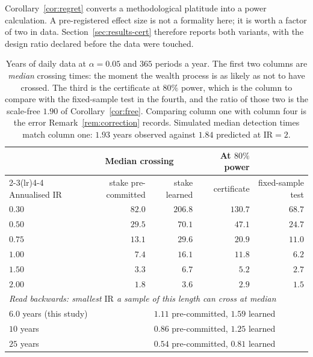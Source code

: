 \documentclass{article}
\theoremstyle{plain}
\theoremstyle{definition}
\begin{document}
Corollary~\ref{cor:regret} converts a methodological platitude into a power calculation. A
pre-registered effect size is not a formality here; it is worth a factor of two in data.
Section~\ref{sec:results-cert} therefore reports both variants, with the design ratio
declared before the data were touched.

\begin{table}[t]
  \centering
  \caption{Years of daily data at $\alpha=0.05$ and $365$ periods a year. The first two
  columns are \emph{median} crossing times: the moment the wealth process is as likely as not
  to have crossed. The third is the certificate at $80\%$ power, which is the column to
  compare with the fixed-sample test in the fourth, and the ratio of those two is the
  scale-free $1.90$ of Corollary~\ref{cor:free}. Comparing column one with column four is the
  error Remark~\ref{rem:correction} records. Simulated median detection times match column
  one: $1.93$ years observed against $1.84$ predicted at $\mathrm{IR}=2$.}
  \label{tab:horizon}
  \small
  \begin{tabular}{lrrrr}
    \toprule
    & \multicolumn{2}{c}{Median crossing} & At $80\%$ power & \\
    \cmidrule(lr){2-3}\cmidrule(lr){4-4}
    Annualised $\mathrm{IR}$ & stake pre-committed & stake learned
      & certificate & fixed-sample test \\
    \midrule
    $0.30$ & $82.0$ & $206.8$ & $130.7$ & $68.7$ \\
    $0.50$ & $29.5$ & $70.1$  & $47.1$  & $24.7$ \\
    $0.75$ & $13.1$ & $29.6$  & $20.9$  & $11.0$ \\
    $1.00$ & $7.4$  & $16.1$  & $11.8$  & $6.2$  \\
    $1.50$ & $3.3$  & $6.7$   & $5.2$   & $2.7$  \\
    $2.00$ & $1.8$  & $3.6$   & $2.9$   & $1.5$  \\
    \midrule
    \multicolumn{5}{l}{\emph{Read backwards: smallest $\mathrm{IR}$ a sample of this length can cross at median}} \\
    \multicolumn{2}{l}{$6.0$ years (this study)} & \multicolumn{3}{l}{$1.11$ pre-committed, $1.59$ learned} \\
    \multicolumn{2}{l}{$10$ years}               & \multicolumn{3}{l}{$0.86$ pre-committed, $1.25$ learned} \\
    \multicolumn{2}{l}{$25$ years}               & \multicolumn{3}{l}{$0.54$ pre-committed, $0.81$ learned} \\
    \bottomrule
  \end{tabular}
\end{table}
\end{document}
